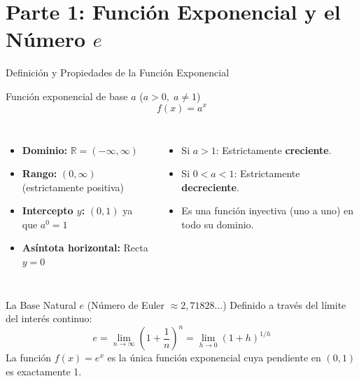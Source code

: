 \documentclass[aspectratio=169]{beamer}
\begin{document}
\begin{frame}[plain]
  \titlepage
\end{frame}

\section{Parte 1: Función Exponencial y el Número $e$}


\begin{frame}{Definición y Propiedades de la Función Exponencial}
  \begin{block}{Función exponencial de base $a$ ($a > 0, \; a \neq 1$)}
    $$f(x) = a^x$$
    \begin{columns}[T]
      \begin{itemize}
        \item \textbf{Dominio:} $\mathbb{R} = (-\infty, \infty)$
        \item \textbf{Rango:} $(0, \infty)$ (estrictamente positiva)
        \item \textbf{Intercepto $y$:} $(0, 1)$ ya que $a^0 = 1$
        \item \textbf{Asíntota horizontal:} Recta $y = 0$
      \end{itemize}
      \begin{itemize}
        \item Si $a > 1$: Estrictamente \textbf{creciente}.
        \item Si $0 < a < 1$: Estrictamente \textbf{decreciente}.
        \item Es una función inyectiva (uno a uno) en todo su dominio.
      \end{itemize}
    \end{columns}
  \end{block}

  \vspace{4pt}
  \begin{block}{La Base Natural $e$ (Número de Euler $\approx 2{,}71828\dots$)}
    Definido a través del límite del interés continuo:
    $$e = \lim_{n \to \infty} \left(1 + \frac{1}{n}\right)^n = \lim_{h \to 0} (1 + h)^{1/h}$$
    La función $f(x) = e^x$ es la única función exponencial cuya pendiente en $(0, 1)$ es exactamente 1.
  \end{block}
\end{frame}
\end{document}
